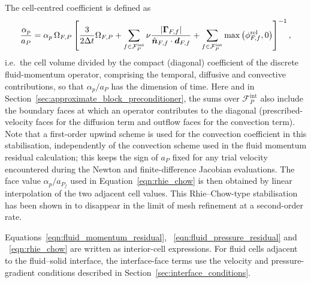 The cell-centred coefficient is defined as
\begin{equation}
    \frac{\alpha_p}{a_{P}}
    =
    \alpha_p \, \Omega_{F,P}
    \left[
    \frac{3}{2\Delta t}\Omega_{F,P}
    +
    \sum_{f \in \mathcal{F}^{\mathrm{int}}_P}
    \nu
    \frac{|\boldsymbol{\Gamma}_{F,f}|}
         {\hat{\boldsymbol{n}}_{F,f} \cdot \boldsymbol{d}_{F,f}}
    +
    \sum_{f \in \mathcal{F}^{\mathrm{int}}_P}
    \max\left(\phi^{\mathrm{rel}}_{F,f},0\right)
    \right]^{-1},
    \label{eqn:rAU_definition}
\end{equation}
i.e.\ the cell volume divided by the compact (diagonal) coefficient of the discrete fluid-momentum operator, comprising the temporal, diffusive and convective contributions, so that $\alpha_p/a_P$ has the dimension of time.
Here and in Section~\ref{sec:approximate_block_preconditioner}, the sums over $\mathcal{F}^{\mathrm{int}}_P$ also include the boundary faces at which an operator contributes to the diagonal (prescribed-velocity faces for the diffusion term and outflow faces for the convection term).
Note that a first-order upwind scheme is used for the convection coefficient in this stabilisation, independently of the convection scheme used in the fluid momentum residual calculation; this keeps the sign of $a_P$ fixed for any trial velocity encountered during the Newton and finite-difference Jacobian evaluations.
The face value $\alpha_p/a_{P_f}$ used in Equation~\eqref{eqn:rhie_chow} is then obtained by linear interpolation of the two adjacent cell values.
This Rhie--Chow-type stabilisation has been shown in \citet{Cardiff2026} to disappear in the limit of mesh refinement at a second-order rate.

Equations~\eqref{eqn:fluid_momentum_residual}, ~\eqref{eqn:fluid_pressure_residual} and ~\eqref{eqn:rhie_chow} are written as interior-cell expressions.
For fluid cells adjacent to the fluid--solid interface, the interface-face terms use the velocity and pressure-gradient conditions described in Section~\ref{sec:interface_conditions}.

